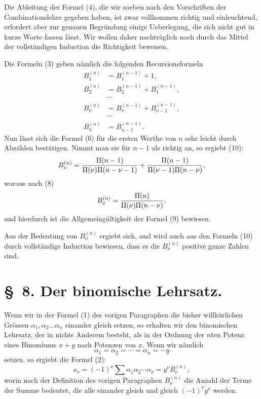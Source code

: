 \documentclass[11pt]{article}
\begin{document}
Die Ableitung der Formel (4), die wir soeben nach den Vorschriften der Combinationslehre gegeben haben, ist zwar vollkommen richtig und einleuchtend, erfordert aber zur genauen Begründung einige Ueberlegung, die sich nicht gut in kurze Worte fassen lässt. Wir wollen daher nachträglich noch durch das Mittel der vollständigen Induction die Richtigkeit beweisen.

Die Formeln (3) geben nämlich die folgenden Recursionsformeln
\begin{equation}
\begin{aligned}
B_1^{(n)}&=B_1^{(n-1)}+1,\\
B_2^{(n)}&=B_2^{(n-1)}+B_1^{(n-1)},\\
&\cdots\\
B_\nu^{(n)}&=B_\nu^{(n-1)}+B_{\nu-1}^{(n-1)},\\
&\cdots\\
B_n^{(n)}&=B_{n-1}^{(n-1)}.
\end{aligned}
\tag{10}
\end{equation}
Nun lässt sich die Formel (6) für die ersten Werthe von $n$ sehr leicht durch Abzählen bestätigen. Nimmt man sie für $n-1$ als richtig an, so ergiebt (10):
\[
 B_\nu^{(n)}={\Pi(n-1)\over \Pi(\nu)\Pi(n-\nu-1)}+{\Pi(n-1)\over \Pi(\nu-1)\Pi(n-\nu)},
\]
woraus nach (8)
\[
 B_\nu^{(n)}={\Pi(n)\over \Pi(\nu)\Pi(n-\nu)},
\]
und hierdurch ist die Allgemeingültigkeit der Formel (9) bewiesen.

Aus der Bedeutung von $B_\nu^{(n)}$ ergiebt sich, und wird auch aus den Formeln (10) durch vollständige Induction bewiesen, dass es die $B_\nu^{(n)}$ positive ganze Zahlen sind.

\section*{\S~8. Der binomische Lehrsatz.}

Wenn wir in der Formel (1) des vorigen Paragraphen die bisher willkürlichen Grössen $\alpha_1,\alpha_2\ldots \alpha_n$ einander gleich setzen, so erhalten wir den binomischen Lehrsatz, der in nichts Anderem besteht, als in der Ordnung der $n$ten Potenz eines Binomiums $x+y$ nach Potenzen von $x$. Wenn wir nämlich
\[
 \alpha_1=\alpha_2=\cdots=\alpha_n=-y
\]
setzen, so ergiebt die Formel (2):
\[
 a_\nu=(-1)^\nu \sum \alpha_1\alpha_2\cdots\alpha_\nu=y^\nu B_\nu^{(n)},
\]
worin nach der Definition des vorigen Paragraphen $B_\nu^{(n)}$ die Anzahl der Terme der Summe bedeutet, die alle einander gleich und gleich $(-1)^\nu y^\nu$ werden.
\end{document}
